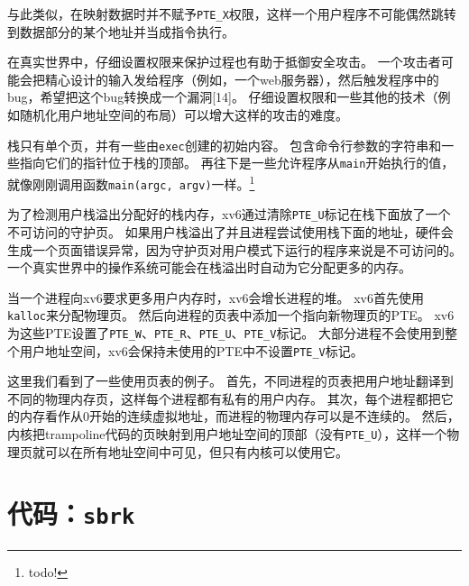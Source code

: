 与此类似，在映射数据时并不赋予\texttt{PTE\_X}权限，这样一个用户程序不可能偶然跳转到数据部分的某个地址并当成指令执行。

在真实世界中，仔细设置权限来保护过程也有助于抵御安全攻击。
一个攻击者可能会把精心设计的输入发给程序（例如，一个web服务器），然后触发程序中的bug，希望把这个bug转换成一个漏洞[14]。
仔细设置权限和一些其他的技术（例如随机化用户地址空间的布局）可以增大这样的攻击的难度。

栈只有单个页，并有一些由\texttt{exec}创建的初始内容。
包含命令行参数的字符串和一些指向它们的指针位于栈的顶部。
再往下是一些允许程序从\texttt{main}开始执行的值，就像刚刚调用函数\texttt{main(argc, argv)}一样。\footnote{todo!}

为了检测用户栈溢出分配好的栈内存，xv6通过清除\texttt{PTE\_U}标记在栈下面放了一个不可访问的守护页。
如果用户栈溢出了并且进程尝试使用栈下面的地址，硬件会生成一个页面错误异常，因为守护页对用户模式下运行的程序来说是不可访问的。
一个真实世界中的操作系统可能会在栈溢出时自动为它分配更多的内存。

当一个进程向xv6要求更多用户内存时，xv6会增长进程的堆。
xv6首先使用\texttt{kalloc}来分配物理页。
然后向进程的页表中添加一个指向新物理页的PTE。
xv6为这些PTE设置了\texttt{PTE\_W}、\texttt{PTE\_R}、\texttt{PTE\_U}、\texttt{PTE\_V}标记。
大部分进程不会使用到整个用户地址空间，xv6会保持未使用的PTE中不设置\texttt{PTE\_V}标记。

这里我们看到了一些使用页表的例子。
首先，不同进程的页表把用户地址翻译到不同的物理内存页，这样每个进程都有私有的用户内存。
其次，每个进程都把它的内存看作从0开始的连续虚拟地址，而进程的物理内存可以是不连续的。
然后，内核把trampoline代码的页映射到用户地址空间的顶部（没有\texttt{PTE\_U}），这样一个物理页就可以在所有地址空间中可见，但只有内核可以使用它。

\section{代码：\texttt{sbrk}}




